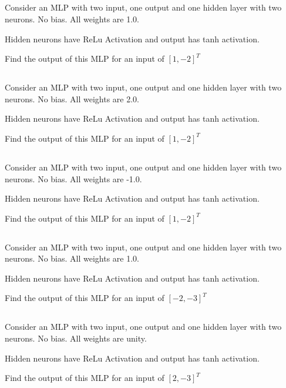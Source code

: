 \begin{frame}
\section{}
Consider an MLP with two input, one output and one hidden layer with two neurons. No bias. All weights are 1.0.

Hidden neurons have ReLu Activation and output has tanh activation.

Find the output of this MLP for an input of $[1, -2]^T$

\end{frame}


\begin{frame}
\section{}
Consider an MLP with two input, one output and one hidden layer with two neurons. No bias. All weights are 2.0.

Hidden neurons have ReLu Activation and output has tanh activation.

Find the output of this MLP for an input of $[1, -2]^T$

\end{frame}


\begin{frame}
\section{}
Consider an MLP with two input, one output and one hidden layer with two neurons. No bias. All weights are -1.0.

Hidden neurons have ReLu Activation and output has tanh activation.

Find the output of this MLP for an input of $[1, -2]^T$

\end{frame}


\begin{frame}
\section{}
Consider an MLP with two input, one output and one hidden layer with two neurons. No bias. All weights are 1.0.

Hidden neurons have ReLu Activation and output has tanh activation.

Find the output of this MLP for an input of $[-2, -3]^T$
\end{frame}


\begin{frame}
\section{}
Consider an MLP with two input, one output and one hidden layer with two neurons. No bias. All weights are unity.

Hidden neurons have ReLu Activation and output has tanh activation.

Find the output of this MLP for an input of $[2, -3]^T$
\end{frame}
